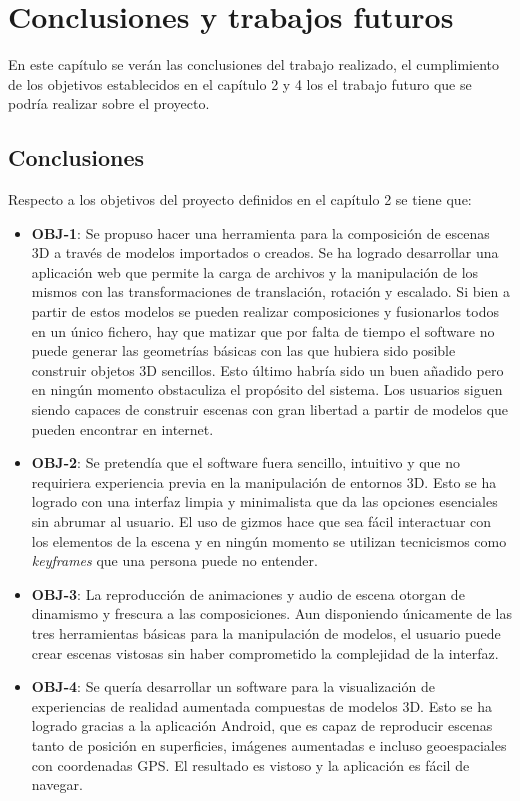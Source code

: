 \chapter{Conclusiones y trabajos futuros}

En este capítulo se verán las conclusiones del trabajo realizado, el cumplimiento de los objetivos establecidos en el capítulo 2 y 4 los el trabajo futuro que se podría realizar sobre el proyecto.

\section{Conclusiones}

Respecto a los objetivos del proyecto definidos en el capítulo 2 se tiene que:

\begin{itemize}
    \item \textbf{OBJ-1}: Se propuso hacer una herramienta para la composición de escenas 3D a través de modelos importados o creados. Se ha logrado desarrollar una aplicación web que permite la carga de archivos y la manipulación de los mismos con las transformaciones de translación, rotación y escalado. Si bien a partir de estos modelos se pueden realizar composiciones y fusionarlos todos en un único fichero, hay que matizar que por falta de tiempo el software no puede generar las geometrías básicas con las que hubiera sido posible construir objetos 3D sencillos. Esto último habría sido un buen añadido pero en ningún momento obstaculiza el propósito del sistema. Los usuarios siguen siendo capaces de construir escenas con gran libertad a partir de modelos que pueden encontrar en internet.
    \item \textbf{OBJ-2}: Se pretendía que el software fuera sencillo, intuitivo y que no requiriera experiencia previa en la manipulación de entornos 3D. Esto se ha logrado con una interfaz limpia y minimalista que da las opciones esenciales sin abrumar al usuario. El uso de gizmos hace que sea fácil interactuar con los elementos de la escena y en ningún momento se utilizan tecnicismos como \textit{keyframes} que una persona puede no entender.
    \item \textbf{OBJ-3}: La reproducción de animaciones y audio de escena otorgan de dinamismo y frescura a las composiciones. Aun disponiendo únicamente de las tres herramientas básicas para la manipulación de modelos, el usuario puede crear escenas vistosas sin haber comprometido la complejidad de la interfaz.
    \item \textbf{OBJ-4}: Se quería desarrollar un software para la visualización de experiencias de realidad aumentada compuestas de modelos 3D. Esto se ha logrado gracias a la aplicación Android, que es capaz de reproducir escenas tanto de posición en superficies, imágenes aumentadas e incluso geoespaciales con coordenadas GPS. El resultado es vistoso y la aplicación es fácil de navegar.

\end{itemize}

